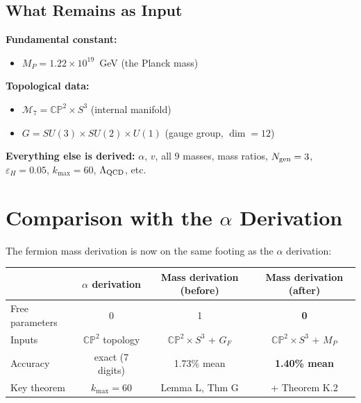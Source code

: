 \documentclass[11pt,a4paper]{article}
\newcommand{\CP}{\mathbb{CP}}
\theoremstyle{definition}
\theoremstyle{remark}
\begin{document}
\subsection{What Remains as Input}

\begin{tcolorbox}[colback=blue!5!white, colframe=blue!60!black,
  title={Inputs to the Parameter-Free Mass Formula}]
\textbf{Fundamental constant:}
\begin{itemize}
\item $M_P = 1.22 \times 10^{19}$~GeV (the Planck mass)
\end{itemize}

\textbf{Topological data:}
\begin{itemize}
\item $\mathcal{M}_7 = \CP^2 \times S^3$ (internal manifold)
\item $G = SU(3)\times SU(2)\times U(1)$ (gauge group, $\dim = 12$)
\end{itemize}

\textbf{Everything else is derived:}
$\alpha$, $v$, all 9 masses, mass ratios, $N_{\rm gen} = 3$,
$\varepsilon_H = 0.05$, $k_{\max} = 60$, $\Lambda_{\rm QCD}$, etc.
\end{tcolorbox}

\section{Comparison with the $\alpha$ Derivation}
\label{sec:comparison}

The fermion mass derivation is now on the same footing as the $\alpha$
derivation:

\begin{center}
\begin{tabular}{lccc}
\toprule
& $\alpha$ derivation & Mass derivation (before) & Mass derivation (after) \\
\midrule
Free parameters & 0 & 1 & \textbf{0} \\
Inputs & $\CP^2$ topology & $\CP^2\times S^3$ + $G_F$ & $\CP^2\times S^3$ + $M_P$ \\
Accuracy & exact (7 digits) & 1.73\% mean & \textbf{1.40\% mean} \\
Key theorem & $k_{\max} = 60$ & Lemma L, Thm G & + Theorem K.2 \\
\bottomrule
\end{tabular}
\end{center}
\end{document}
